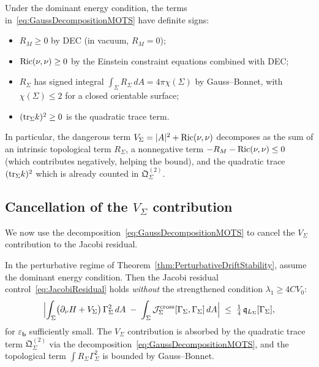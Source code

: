 \begin{remark}\label{rem:GaussDecSigns}
Under the dominant energy condition, the terms in~\eqref{eq:GaussDecompositionMOTS} have definite signs:
\begin{itemize}
    \item $R_M\ge0$ by DEC (in vacuum, $R_M=0$);
    \item $\mathrm{Ric}(\nu,\nu)\ge0$ by the Einstein constraint equations combined with DEC;
    \item $R_\Sigma$ has signed integral $\int_\Sigma R_\Sigma\,dA=4\pi\chi(\Sigma)$ by Gauss--Bonnet, with $\chi(\Sigma)\le2$ for a closed orientable surface;
    \item $(\mathrm{tr}_\Sigma k)^2\ge0$ is the quadratic trace term.
\end{itemize}
In particular, the dangerous term $V_\Sigma=|A|^2+\mathrm{Ric}(\nu,\nu)$ decomposes as the sum of an intrinsic topological term $R_\Sigma$, a nonnegative term $-R_M-\mathrm{Ric}(\nu,\nu)\le0$ (which contributes negatively, helping the bound), and the quadratic trace $(\mathrm{tr}_\Sigma k)^2$ which is already counted in $\mathfrak Q_\Sigma^{(2)}$.
\end{remark}

\subsection{Cancellation of the $V_\Sigma$ contribution}

We now use the decomposition~\eqref{eq:GaussDecompositionMOTS} to cancel the $V_\Sigma$ contribution to the Jacobi residual.

\begin{theorem}\label{thm:GaussCancellation}
In the perturbative regime of Theorem~\ref{thm:PerturbativeDriftStability}, assume the dominant energy condition. Then the Jacobi residual control~\eqref{eq:JacobiResidual} holds \emph{without} the strengthened condition $\lambda_1\ge 4CV_0$:
\begin{equation}\label{eq:GaussCancellationResult}
    \Bigl|\int_\Sigma\bigl(\partial_\nu H + V_\Sigma\bigr)\,\Gamma_\Sigma^2\,dA
    \;-\;\int_\Sigma\mathcal J_\Sigma^{\mathrm{cross}}[\Gamma_\Sigma,\Gamma_\Sigma]\,dA\Bigr|
    \;\le\;\tfrac14\,\mathfrak q_{L_\Sigma}[\Gamma_\Sigma] ,
\end{equation}
for $\varepsilon_{\mathbf b}$ sufficiently small. The $V_\Sigma$ contribution is absorbed by the quadratic trace term $\mathfrak Q_\Sigma^{(2)}$ via the decomposition~\eqref{eq:GaussDecompositionMOTS}, and the topological term $\int R_\Sigma\Gamma_\Sigma^2$ is bounded by Gauss--Bonnet.
\end{theorem}

